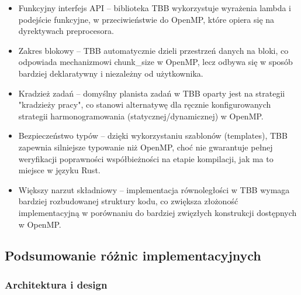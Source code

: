 \begin{itemize}
    \item Funkcyjny interfejs API – biblioteka TBB wykorzystuje wyrażenia lambda i podejście funkcyjne, w przeciwieństwie do OpenMP, które opiera się na dyrektywach preprocesora.
    \item Zakres blokowy – TBB automatycznie dzieli przestrzeń danych na bloki, co odpowiada mechanizmowi chunk\_size w OpenMP, lecz odbywa się w sposób bardziej deklaratywny i niezależny od użytkownika.
    \item Kradzież zadań – domyślny planista zadań w TBB oparty jest na strategii "kradzieży pracy", co stanowi alternatywę dla ręcznie konfigurowanych strategii harmonogramowania (statycznej/dynamicznej) w OpenMP.
    \item Bezpieczeństwo typów – dzięki wykorzystaniu szablonów (templates), TBB zapewnia silniejsze typowanie niż OpenMP, choć nie gwarantuje pełnej weryfikacji poprawności współbieżności na etapie kompilacji, jak ma to miejsce w języku Rust.
    \item Większy narzut składniowy – implementacja równoległości w TBB wymaga bardziej rozbudowanej struktury kodu, co zwiększa złożoność implementacyjną w porównaniu do bardziej zwięzłych konstrukcji dostępnych w OpenMP.

\end{itemize}



\subsection{Podsumowanie różnic implementacyjnych}
\subsubsection{Architektura i design}

